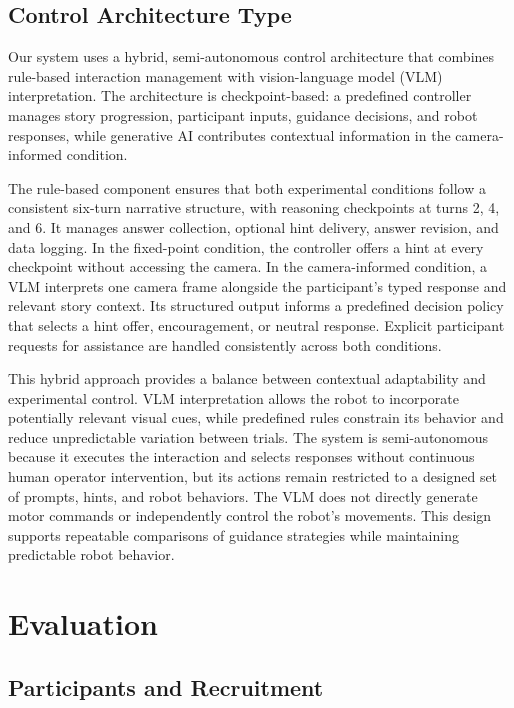 \documentclass[conference]{IEEEtran}
\begin{document}
\subsection{Control Architecture Type}

Our system uses a hybrid, semi-autonomous control architecture that combines rule-based interaction management with vision-language model (VLM) interpretation. The architecture is checkpoint-based: a predefined controller manages story progression, participant inputs, guidance decisions, and robot responses, while generative AI contributes contextual information in the camera-informed condition.

The rule-based component ensures that both experimental conditions follow a consistent six-turn narrative structure, with reasoning checkpoints at turns 2, 4, and 6. It manages answer collection, optional hint delivery, answer revision, and data logging. In the fixed-point condition, the controller offers a hint at every checkpoint without accessing the camera. In the camera-informed condition, a VLM interprets one camera frame alongside the participant's typed response and relevant story context. Its structured output informs a predefined decision policy that selects a hint offer, encouragement, or neutral response. Explicit participant requests for assistance are handled consistently across both conditions.

This hybrid approach provides a balance between contextual adaptability and experimental control. VLM interpretation allows the robot to incorporate potentially relevant visual cues, while predefined rules constrain its behavior and reduce unpredictable variation between trials. The system is semi-autonomous because it executes the interaction and selects responses without continuous human operator intervention, but its actions remain restricted to a designed set of prompts, hints, and robot behaviors. The VLM does not directly generate motor commands or independently control the robot's movements. This design supports repeatable comparisons of guidance strategies while maintaining predictable robot behavior.


\section{Evaluation}

\subsection{Participants and Recruitment}
\end{document}
